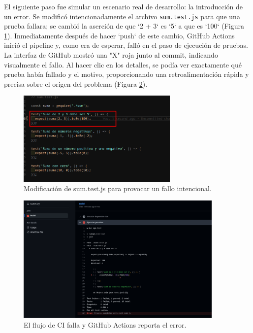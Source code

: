 \documentclass[12pt, a4paper]{article}
\begin{document}
El siguiente paso fue simular un escenario real de desarrollo: la introducci\'on de un error. Se modific\'o intencionadamente el archivo \texttt{sum.test.js} para que una prueba fallara; se cambi\'o la aserci\'on de que `2 + 3` es `5` a que es `100` (Figura \ref{fig:error_intencional}). Inmediatamente despu\'es de hacer `push` de este cambio, GitHub Actions inici\'o el pipeline y, como era de esperar, fall\'o en el paso de ejecuci\'on de pruebas. La interfaz de GitHub mostr\'o una "X" roja junto al commit, indicando visualmente el fallo. Al hacer clic en los detalles, se pod\'ia ver exactamente qu\'e prueba hab\'ia fallado y el motivo, proporcionando una retroalimentaci\'on r\'apida y precisa sobre el origen del problema (Figura \ref{fig:workflow_rojo}).

\begin{figure}[H]
    \centering
    \includegraphics[width=0.7\textwidth]{img/configuramos sumtestjs para que falle haciendo que la suma de 2 y 3 sea 100 y por ende de error.png}
    \caption{Modificaci\'on de sum.test.js para provocar un fallo intencional.}
    \label{fig:error_intencional}
\end{figure}

\begin{figure}[H]
    \centering
    \includegraphics[width=0.9\textwidth]{img/el codigo fallo y en github podemos ver en donde y que linea nos da el error para poder corregir y por ende nos da una x en color rojo de error.png}
    \caption{El flujo de CI falla y GitHub Actions reporta el error.}
    \label{fig:workflow_rojo}
\end{figure}
\end{document}
